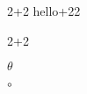 \documentclass[options]{article}
\begin{document}
2+2
hello+22

2+2

$\theta$

$\circ$  
\end{document}
